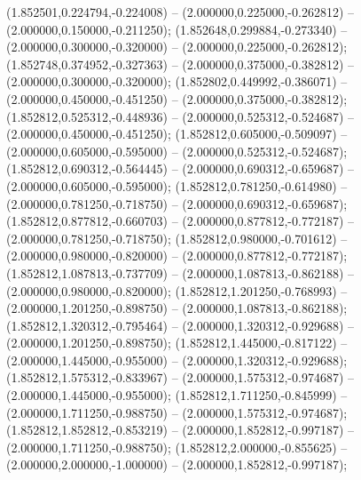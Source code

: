  (1.852501,0.224794,-0.224008) -- (2.000000,0.225000,-0.262812) -- (2.000000,0.150000,-0.211250);
 (1.852648,0.299884,-0.273340) -- (2.000000,0.300000,-0.320000) -- (2.000000,0.225000,-0.262812);
 (1.852748,0.374952,-0.327363) -- (2.000000,0.375000,-0.382812) -- (2.000000,0.300000,-0.320000);
 (1.852802,0.449992,-0.386071) -- (2.000000,0.450000,-0.451250) -- (2.000000,0.375000,-0.382812);
 (1.852812,0.525312,-0.448936) -- (2.000000,0.525312,-0.524687) -- (2.000000,0.450000,-0.451250);
 (1.852812,0.605000,-0.509097) -- (2.000000,0.605000,-0.595000) -- (2.000000,0.525312,-0.524687);
 (1.852812,0.690312,-0.564445) -- (2.000000,0.690312,-0.659687) -- (2.000000,0.605000,-0.595000);
 (1.852812,0.781250,-0.614980) -- (2.000000,0.781250,-0.718750) -- (2.000000,0.690312,-0.659687);
 (1.852812,0.877812,-0.660703) -- (2.000000,0.877812,-0.772187) -- (2.000000,0.781250,-0.718750);
 (1.852812,0.980000,-0.701612) -- (2.000000,0.980000,-0.820000) -- (2.000000,0.877812,-0.772187);
 (1.852812,1.087813,-0.737709) -- (2.000000,1.087813,-0.862188) -- (2.000000,0.980000,-0.820000);
 (1.852812,1.201250,-0.768993) -- (2.000000,1.201250,-0.898750) -- (2.000000,1.087813,-0.862188);
 (1.852812,1.320312,-0.795464) -- (2.000000,1.320312,-0.929688) -- (2.000000,1.201250,-0.898750);
 (1.852812,1.445000,-0.817122) -- (2.000000,1.445000,-0.955000) -- (2.000000,1.320312,-0.929688);
 (1.852812,1.575312,-0.833967) -- (2.000000,1.575312,-0.974687) -- (2.000000,1.445000,-0.955000);
 (1.852812,1.711250,-0.845999) -- (2.000000,1.711250,-0.988750) -- (2.000000,1.575312,-0.974687);
 (1.852812,1.852812,-0.853219) -- (2.000000,1.852812,-0.997187) -- (2.000000,1.711250,-0.988750);
 (1.852812,2.000000,-0.855625) -- (2.000000,2.000000,-1.000000) -- (2.000000,1.852812,-0.997187);
